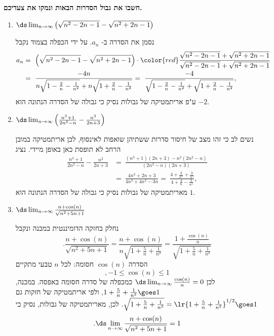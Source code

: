 \textbf{חשבו את גבול הסדרות הבאות ונמקו את צעדיכם.}
\begin{enumerate}
\item $\ds\lim_{n \to \infty} \left( \sqrt{n^2 - 2n - 1} - \sqrt{n^2 + 2n - 1} \right)$
\begin{solbox}
    נסמן את הסדרה ב-
$a_n$.
על ידי הכפלה בצמוד נקבל
\begin{align*}
    a_n
    &=\ \left( \sqrt{n^2 - 2n - 1} - \sqrt{n^2 + 2n - 1} \right)\cdot{\color{red}\frac{\sqrt{n^2 - 2n - 1} + \sqrt{n^2 + 2n - 1}}{\sqrt{n^2 - 2n - 1} + \sqrt{n^2 + 2n - 1}}}\\
    &=\ \frac{-4n}{n\sqrt{1 - \frac{2}{n} - \frac{1}{n^2}} + n\sqrt{1 + \frac{2}{n} - \frac{1}{n^2}}}
    =\ \frac{-4}{\sqrt{1 - \frac{2}{n} - \frac{1}{n^2}} + \sqrt{1 + \frac{2}{n} - \frac{1}{n^2}}},
\end{align*}
ע"פ אריתמטיקה של גבולות נסיק כי גבולה של הסדרה הנתונה הוא
$-2$.
\end{solbox}
\item $\ds\lim_{n \to \infty} \left( \frac{n^3+1}{2n^2 - n} - \frac{n^2}{2n + 3} \right)$
\begin{solbox}
נשים לב כי זהו מצב של חיסור סדרות ששתיהן שואפות לאינסוף, לכן אריתמטיקה במובן הרחב לא תופסת כאן באופן מיידי.
נציג
\begin{align*}
\frac{n^3+1}{2n^2 - n} - \frac{n^2}{2n + 3}&=\ \frac{(n^3+1)(2n+3)-n^2(2n^2-n)}{(2n^2-n)(2n+3)}\\
&=\ \frac{4n^3+2n+3}{4n^3+4n^2-3n}=\ \frac{4+\frac{2}{n^2}+\frac{3}{n^3}}{4+\frac{4}{n}-\frac{3}{n^2}},
\end{align*}
מאריתמטיקה של גבולות נסיק כי גבולה של הסדרה הנתונה הוא
$1$.
\end{solbox}

\item $\ds\lim_{n \to \infty} \frac{n + \cos(n)}{\sqrt{n^2 + 5n + 1}}$
\begin{solbox}
נחלק בחזקה הדומיננטית במכנה ונקבל
$$.\frac{n + \cos(n)}{\sqrt{n^2 + 5n + 1}}=\frac{n + \cos(n)}{n\sqrt{1 + \frac{5}{n} + \frac{1}{n^2}}}=\frac{1 + \frac{\cos(n)}{n}}{\sqrt{1 + \frac{5}{n} + \frac{1}{n^2}}}$$
הסדרה $\cos(n)$ חסומה:
לכל $n$ טבעי מתקיים
$$,-1\le\cos (n)\le 1$$
לכן
$\ds\lim_{n\to\infty}\frac{\cos (n)}{n}=0$
כמכפלה של סדרה חסומה באפסה.
במכנה, $1 + \frac{5}{n} + \frac{1}{n^2}\goes1$, ולפי אריתמטיקה של חזקות גם $\sqrt{1 + \frac{5}{n} + \frac{1}{n^2}}=\lr{1 + \frac{5}{n} + \frac{1}{n^2}}^{1/2}\goes1$.
לכן, מאריתמטיקה של גבולות, נסיק כי
$$.\ds\lim_{n \to \infty} \frac{n + \cos(n)}{\sqrt{n^2 + 5n + 1}}=1$$
\end{solbox}
\eMs
\end{enumerate}
